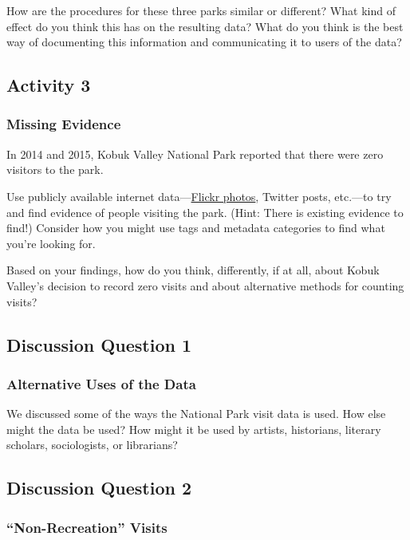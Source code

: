 \documentclass[
  letterpaper,
  DIV=11,
  numbers=noendperiod]{scrartcl}
\begin{document}
How are the procedures for these three parks similar or different? What
kind of effect do you think this has on the resulting data? What do you
think is the best way of documenting this information and communicating
it to users of the data?

\subsection{Activity 3}\label{activity-3-1}

\subsubsection{Missing Evidence}\label{missing-evidence}

In 2014 and 2015, Kobuk Valley National Park reported that there were
zero visitors to the park.

Use publicly available internet
data---\href{https://www.flickr.com/}{Flickr photos}, Twitter posts,
etc.---to try and find evidence of people visiting the park. (Hint:
There is existing evidence to find!) Consider how you might use tags and
metadata categories to find what you're looking for.

Based on your findings, how do you think, differently, if at all, about
Kobuk Valley's decision to record zero visits and about alternative
methods for counting visits?

\subsection{Discussion Question 1}\label{discussion-question-1-1}

\subsubsection{Alternative Uses of the
Data}\label{alternative-uses-of-the-data}

We discussed some of the ways the National Park visit data is used. How
else might the data be used? How might it be used by artists,
historians, literary scholars, sociologists, or librarians?

\subsection{Discussion Question 2}\label{discussion-question-2-1}

\subsubsection{``Non-Recreation'' Visits}\label{non-recreation-visits}
\end{document}
